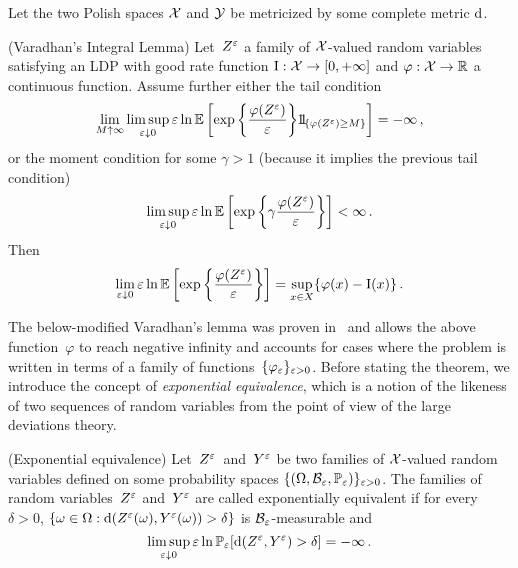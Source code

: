 Let the two Polish spaces $\mathcal{X}$ and $\mathcal{Y}$ be metricized by some complete metric $\mathrm{d}$.
\begin{theorem} (Varadhan's Integral Lemma)\label{thm:varadhan} %
Let~$Z^{\varepsilon}$ a family of $\mathcal{X}$-valued random variables satisfying an LDP with good rate function $\mathrm{I}:\mathcal{X}\to [0,+\infty]$ and $\varphi: \mathcal{X} \to \mathbb{R}$ a continuous function. 
Assume further either the tail condition
$$
\lim\limits_{M\uparrow \infty} \limsup_{\eps \downarrow 0}
\eps\ln \EE\left[\exp\left\{\frac{\varphi(Z^{\eps})}{\eps}\right\}\ind_{ \{ \varphi(Z^{\eps}) \geq M\}}\right]  = -\infty\,,
$$
or the moment condition for some $\gamma > 1$ (because it implies the previous tail condition)
$$
\limsup\limits_{\varepsilon \downarrow 0}
\varepsilon\ln \mathbb{E}\left[\exp\left\{\gamma \frac{\varphi(Z^{\varepsilon})}{\varepsilon}\right\}\right]
< \infty\,.
$$
Then
$$
\lim_{\varepsilon \downarrow 0}
\varepsilon\ln \mathbb{E}\left[\exp\left\{\frac{\varphi(Z^{\varepsilon})}{\varepsilon}\right\}\right]
= \sup\limits_{x \in X} \{\varphi(x) - \mathrm{I}(x) \}\,.
$$
\end{theorem}

The below-modified Varadhan's lemma was proven in~\cite{Robertson2010SampleModels} and allows the above function~$\varphi$ to reach negative infinity and accounts for cases where the problem is written in terms of a family of functions~$\{\varphi_{\varepsilon}\}_{\varepsilon>0}$. Before stating the theorem, we introduce the concept of \emph{exponential equivalence}, which is a notion of the likeness of two sequences of random variables from the point of view of the large deviations theory.
\begin{definition} (Exponential equivalence)\label{def:exponential_equivalence}  %
Let~$Z^{\varepsilon}$~and~$Y^\varepsilon$ be two families of $\mathcal{X}$\nobreakdash-valued random variables defined on some probability spaces $\{ (\Omega,\mathcal{B}_{\varepsilon},\mathbb{P}_\varepsilon)\}_{\varepsilon>0}$. The families of random variables~$Z^{\varepsilon}$ and~$Y^\varepsilon$ are called exponentially equivalent if for every $\delta > 0$,
$\{\omega\in\Omega: \mathrm{d}(Z^{\varepsilon}(\omega),Y^\varepsilon(\omega)) > \delta\}$ is $\mathcal{B}_\varepsilon$-measurable
and 
$$
\limsup\limits_{\varepsilon \downarrow 0} \varepsilon\ln\mathbb{P}_\varepsilon[\mathrm{d}(Z^{\varepsilon},Y^\varepsilon) > \delta] = - \infty\,.
$$
\end{definition}

